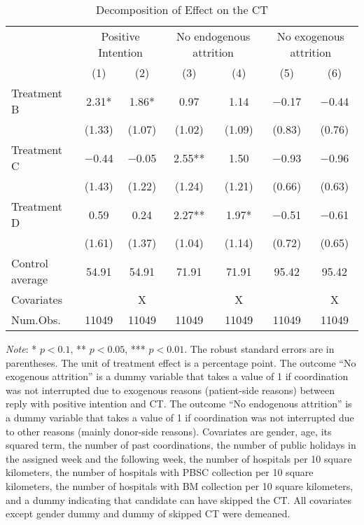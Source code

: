 \documentclass[12pt, a4paper]{article}
\begin{document}
\begin{table}[H]

\caption{\label{tab:lm-test-decompose}Decomposition of Effect on the CT}
\centering
\fontsize{8}{10}\selectfont
\begin{threeparttable}
\begin{tabular}[t]{>{\raggedright\arraybackslash}p{20em}cccccc}
\toprule
\multicolumn{1}{c}{ } & \multicolumn{2}{c}{Positive Intention} & \multicolumn{2}{c}{No endogenous attrition} & \multicolumn{2}{c}{No exogenous attrition} \\
\cmidrule(l{3pt}r{3pt}){2-3} \cmidrule(l{3pt}r{3pt}){4-5} \cmidrule(l{3pt}r{3pt}){6-7}
  & (1) & (2) & (3) & (4) & (5) & (6)\\
\midrule
Treatment B & \num{2.31}* & \num{1.86}* & \num{0.97} & \num{1.14} & \num{-0.17} & \num{-0.44}\\
 & (\num{1.33}) & (\num{1.07}) & (\num{1.02}) & (\num{1.09}) & (\num{0.83}) & (\num{0.76})\\
Treatment C & \num{-0.44} & \num{-0.05} & \num{2.55}** & \num{1.50} & \num{-0.93} & \num{-0.96}\\
 & (\num{1.43}) & (\num{1.22}) & (\num{1.24}) & (\num{1.21}) & (\num{0.66}) & (\num{0.63})\\
Treatment D & \num{0.59} & \num{0.24} & \num{2.27}** & \num{1.97}* & \num{-0.51} & \num{-0.61}\\
 & (\num{1.61}) & (\num{1.37}) & (\num{1.04}) & (\num{1.14}) & (\num{0.72}) & (\num{0.65})\\
\midrule
Control average & 54.91 & 54.91 & 71.91 & 71.91 & 95.42 & 95.42\\
Covariates &  & X &  & X &  & X\\
Num.Obs. & \num{11049} & \num{11049} & \num{11049} & \num{11049} & \num{11049} & \num{11049}\\
\bottomrule
\end{tabular}
\begin{tablenotes}
\item \emph{Note}: * $p < 0.1$, ** $p < 0.05$, *** $p < 0.01$. The robust standard errors are in parentheses. The unit of treatment effect is a percentage point. The outcome ``No exogenous attrition'' is a dummy variable that takes a value of 1 if coordination was not interrupted due to exogenous reasons (patient-side reasons) between reply with positive intention and CT. The outcome ``No endogenous attrition'' is a dummy variable that takes a value of 1 if coordination was not interrupted due to other reasons (mainly donor-side reasons). Covariates are gender, age, its squared term, the number of past coordinations, the number of public holidays in the assigned week and the following week, the number of hospitals per 10 square kilometers, the number of hospitals with PBSC collection per 10 square kilometers, the number of hospitals with BM collection per 10 square kilometers, and a dummy indicating that candidate can have skipped the CT. All covariates except gender dummy and dummy of skipped CT were demeaned.
\end{tablenotes}
\end{threeparttable}
\end{table}
\end{document}
